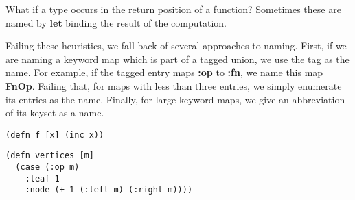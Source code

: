 What if a type occurs in the return position of a function?
Sometimes these are named by \textbf{let} binding the result
of the computation.

Failing these heuristics, we fall back of several approaches
to naming.
First, if we are naming a keyword map which is part of a tagged
union, we use the tag as the name. For example, if the tagged entry
maps \textbf{:op} to \textbf{:fn}, we name this map \textbf{FnOp}.
Failing that, for maps with less than three entries, we simply
enumerate its entries as the name.
Finally, for large keyword maps, we give an abbreviation
of its keyset as a name.

\begin{Verbatim}
(defn f [x] (inc x))
\end{Verbatim}

\begin{figure*}
\begin{Verbatim}
(defn vertices [m]
  (case (:op m)
    :leaf 1
    :node (+ 1 (:left m) (:right m))))
\end{Verbatim}
\label{code:vertices}
\end{figure*}



